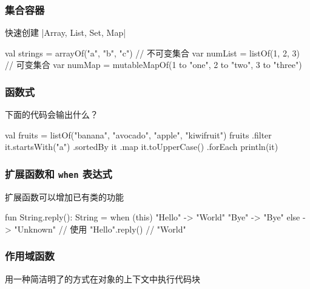 \begin{frame}[fragile]
\frametitle{集合容器}
\begin{quotebox}
    快速创建 |Array, List, Set, Map|
\end{quotebox}
\begin{kotlincode}
    val strings = arrayOf("a", "b", "c")
    // 不可变集合
    var numList = listOf(1, 2, 3)
    // 可变集合
    var numMap = mutableMapOf(1 to "one", 2 to "two", 3 to "three")
\end{kotlincode}
\end{frame}

\begin{frame}[fragile]
\frametitle{函数式}
\begin{quotebox}[yzlgreen]
    下面的代码会输出什么？
\end{quotebox}
\begin{kotlincode}[emph={[1]sortedBy,filter,map,forEach}]
    val fruits = listOf("banana", "avocado", "apple", "kiwifruit")
    fruits
      .filter { it.startsWith("a") }
      .sortedBy { it }
      .map { it.toUpperCase() }
      .forEach { println(it) }
\end{kotlincode}
\end{frame}

\begin{frame}[fragile]
\frametitle{扩展函数和 \texttt{when} 表达式}
\begin{quotebox}
    扩展函数可以增加已有类的功能
\end{quotebox}
\begin{kotlincode}
    fun String.reply(): String =
        when (this) {
            "Hello"    -> "World"
            "Bye"      -> "Bye"
            else       -> "Unknown"
        }
    // 使用
    "Hello".reply() // "World"
\end{kotlincode}
\end{frame}

\begin{frame}[fragile]
\frametitle{作用域函数}
\begin{quotebox}
    用一种简洁明了的方式在对象的上下文中执行代码块
\end{quotebox}
\end{frame}

